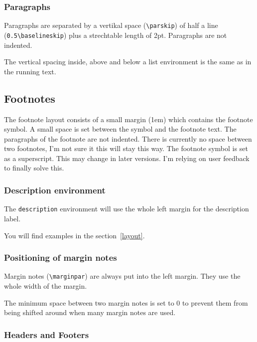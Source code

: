 \subsubsection{Paragraphs}

Paragraphs are separated by a vertikal space (\verb|\parskip|) of 
half a line (\verb|0.5\baselineskip|) plus a strechtable length of 2pt.
Paragraphs are not indented.

The vertical spacing inside, above and below a list environment is the 
same as in the running text.

\subsection{Footnotes}

The footnote layout consists of a small margin (1em) which contains 
the footnote symbol. A small space is set between the symbol and the 
footnote text. The paragraphs of the footnote are not indented. There 
is currently no space between two footnotes, I'm not sure it this will 
stay this way. The footnote symbol is set as a superscript. This may 
change in later versions. I'm relying on user feedback to finally 
solve this.

\subsubsection{Description environment}

The \texttt{description} environment will use the whole left margin 
for the description label. 

\seealso{\ref{layout}}
You will find examples in the section~\ref{layout}.

\subsubsection{Positioning of margin notes}

Margin notes (\verb|\marginpar|) are always put into the left margin. 
They use the whole width of the margin.

The minimum space between two margin notes is set to 0 to prevent 
them from being shifted around when many margin notes are used.

\subsubsection{Headers and Footers} \label{pagestyle}


